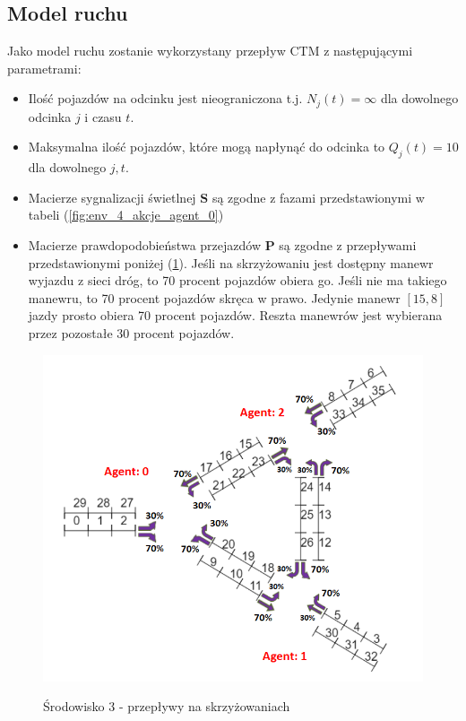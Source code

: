 \documentclass[12pt]{book}
\theoremstyle{plain}
\newcommand{\myref}[1]{(\ref{#1})}
\begin{document}
\subsection{Model ruchu}
Jako model ruchu zostanie wykorzystany przepływ CTM z następującymi parametrami:
\begin{itemize}
	\item Ilość pojazdów na odcinku jest nieograniczona t.j. $N_j(t)=\infty$ dla dowolnego odcinka $j$ i czasu $t$.
	\item Maksymalna ilość pojazdów, które mogą napłynąć do odcinka to $Q_j(t)=10$ dla dowolnego $j,t$.
	\item Macierze sygnalizacji świetlnej $\textbf{S}$ są zgodne z fazami przedstawionymi w tabeli \myref{fig:env_4_akcje_agent_0}
	\item Macierze prawdopodobieństwa przejazdów $\textbf{P}$ są zgodne z przepływami przedstawionymi poniżej \myref{fig:srodowisko_3_przeplywy}. Jeśli na skrzyżowaniu jest dostępny manewr wyjazdu z sieci dróg, to 70 procent pojazdów obiera go. Jeśli nie ma takiego manewru, to 70 procent pojazdów skręca w prawo. Jedynie manewr $[15,8]$ jazdy prosto obiera 70 procent pojazdów. Reszta manewrów jest wybierana przez pozostałe 30 procent pojazdów. 
\end{itemize}
\begin{figure}[H]
	\centering
	\includegraphics[width=14cm]{images/srodowisko_3_przeplywy}
	\label{fig:srodowisko_3_przeplywy}
	\caption{Środowisko 3 - przepływy na skrzyżowaniach}
\end{figure}
\end{document}
